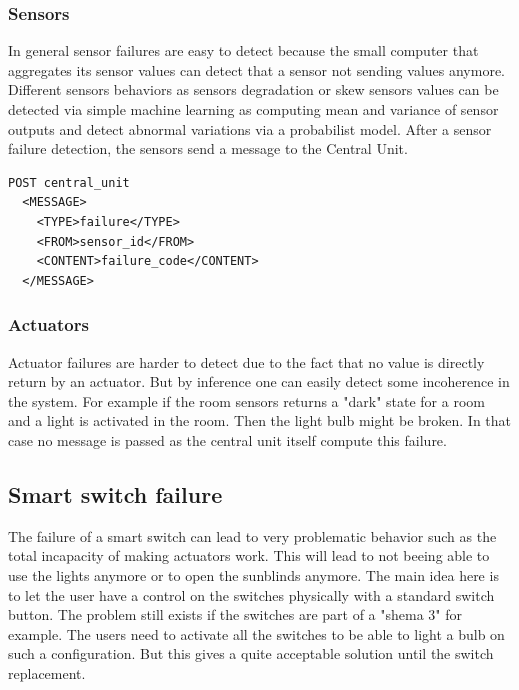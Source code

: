\documentclass{acm_proc_article-sp}
\begin{document}
\subsubsection{Sensors}
In general sensor failures are easy to detect because the small computer that aggregates its sensor values can detect that a sensor not sending values anymore. 
Different sensors behaviors as sensors degradation or skew sensors values can be detected via simple machine learning as computing mean and variance of sensor outputs and detect abnormal variations via a probabilist model.
After a sensor failure detection, the sensors send a message to the Central Unit. %
\begin{verbatim}
POST central_unit 
  <MESSAGE>
    <TYPE>failure</TYPE>
    <FROM>sensor_id</FROM>
    <CONTENT>failure_code</CONTENT>
  </MESSAGE>
\end{verbatim}
\subsubsection{Actuators} 
Actuator failures are harder to detect due to the fact that no value is directly return by an actuator.
But by inference one can easily detect some incoherence in the system.
For example if the room sensors returns a "dark" state for a room and a light is activated in the room. Then the light bulb might be broken.
In that case no message is passed as the central unit itself compute this failure.
\subsection{Smart switch failure}
The failure of a smart switch can lead to very problematic behavior such as the total incapacity of making actuators work.
This will lead to not beeing able to use the lights anymore or to open the sunblinds anymore.
The main idea here is to let the user have a control on the switches physically with a standard switch button.
The problem still exists if the switches are part of a "shema 3" for example. The users need to activate all the switches to be able to light a bulb on such a configuration.
But this gives a quite acceptable solution until the switch replacement.
\end{document}
